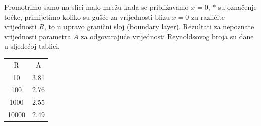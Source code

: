 \documentclass[a4paper]{article}
\begin{document}
Promotrimo samo na slici malo mrežu kada se približavamo $x=0$, $*$ su označenje točke, primijetimo koliko su gušće za vrijednosti blizu $x=0$ za različite vrijednosti $R$, to u upravo granični sloj (boundary layer).
Rezultati za nepoznate vrijednosti parametra $A$ za odgovarajuće vrijednosti Reynoldsovog broja su dane u sljedećoj tablici.

\begin{center}
\begin{tabular}{|| c | c ||}
 \hline
  R & A\\
 \hhline{|=|=|}
 10 & 3.81\\
 \hline
 100 & 2.76\\
 \hline
 1000 & 2.55\\
 \hline
 10000 & 2.49\\
 \hline
\end{tabular}
\end{center}



\end{document}
